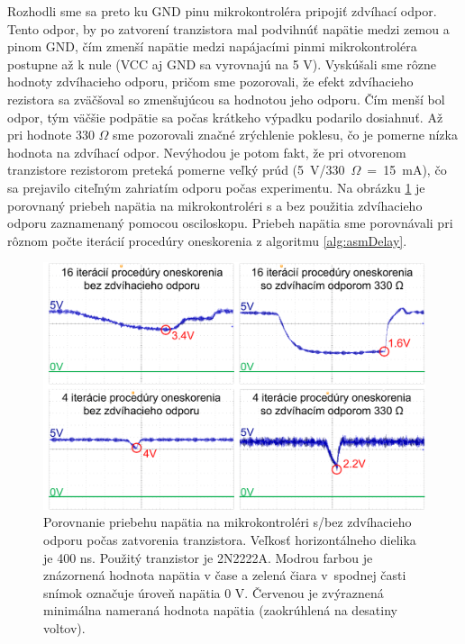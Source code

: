 Rozhodli sme sa preto ku GND pinu mikrokontroléra pripojiť zdvíhací odpor. Tento odpor, by po zatvorení tranzistora mal podvihnúť napätie medzi zemou a pinom GND, čím zmenší napätie medzi napájacími pinmi mikrokontroléra postupne až k nule (VCC aj GND sa vyrovnajú na 5 V). Vyskúšali sme rôzne hodnoty zdvíhacieho odporu, pričom sme pozorovali, že efekt zdvíhacieho rezistora sa zväčšoval so zmenšujúcou sa hodnotou jeho odporu. Čím menší bol odpor, tým väčšie podpätie sa počas krátkeho výpadku podarilo dosiahnuť. Až pri hodnote 330 $\Omega$ sme pozorovali značné zrýchlenie poklesu, čo je pomerne nízka hodnota na zdvíhací odpor. Nevýhodou je potom fakt, že pri otvorenom tranzistore rezistorom preteká pomerne veľký prúd (5~V/330~$\Omega$~=~15~mA), čo sa prejavilo citeľným zahriatím odporu počas experimentu. Na obrázku \ref{obr:vccAnalysis} je porovnaný priebeh napätia na mikrokontroléri s a bez použitia zdvíhacieho odporu zaznamenaný pomocou osciloskopu. Priebeh napätia sme porovnávali pri rôznom počte iterácií procedúry oneskorenia z algoritmu \ref{alg:asmDelay}.

\begin{figure}
    \centerline{\includegraphics[width=1\textwidth]{images/vccAnalysis.png}}
    \caption[Priebeh napätia na mikrokontroléri s/bez zdvíhacieho odporu]{Porovnanie priebehu napätia na mikrokontroléri s/bez zdvíhacieho odporu počas zatvorenia tranzistora. Veľkosť horizontálneho dielika je 400 ns. Použitý tranzistor je 2N2222A. Modrou farbou je znázornená hodnota napätia v čase a zelená čiara v~spodnej časti snímok označuje úroveň napätia 0 V. Červenou je zvýraznená minimálna nameraná hodnota napätia (zaokrúhlená na desatiny voltov).}
    \label{obr:vccAnalysis}
\end{figure}

